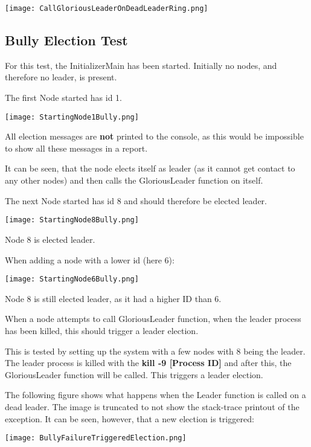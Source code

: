 \begin{center}
	\texttt{[image: CallGloriousLeaderOnDeadLeaderRing.png]}
\end{center}

\subsection{Bully Election Test}
For this test, the InitializerMain has been started. Initially no nodes, and therefore no leader, is present. 

The first Node started has id 1.

\begin{center}
	\texttt{[image: StartingNode1Bully.png]}
\end{center}

All election messages are \textbf{not} printed to the console, as this would be impossible to show all these messages in a report.

It can be seen, that the node elects itself as leader (as it cannot get contact to any other nodes) and then calls the GloriousLeader function on itself. 

The next Node started has id 8 and should therefore be elected leader.

\begin{center}
	\texttt{[image: StartingNode8Bully.png]}
\end{center}

Node 8 is elected leader. 

When adding a node with a lower id (here 6):

\begin{center}
	\texttt{[image: StartingNode6Bully.png]}
\end{center}

Node 8 is still elected leader, as it had a higher ID than 6.

When a node attempts to call GloriousLeader function, when the leader process has been killed, this should trigger a leader election. 

This is tested by setting up the system with a few nodes with 8 being the leader. The leader process is killed with the \textbf{kill -9 [Process ID]} and after this, the GloriousLeader function will be called. This triggers a leader election.

The following figure shows what happens when the Leader function is called on a dead leader. The image is truncated to not show the stack-trace printout of the exception. It can be seen, however, that a new election is triggered:

\begin{center}
	\texttt{[image: BullyFailureTriggeredElection.png]}
\end{center}
